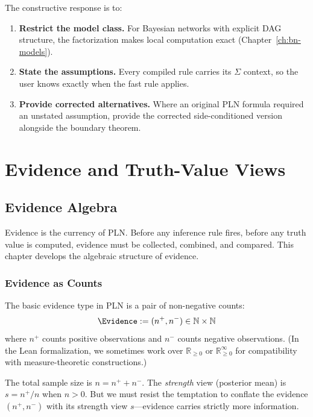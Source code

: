 \documentclass[11pt,openany]{report}
\begin{document}
The constructive response is to:
\begin{enumerate}
\item \textbf{Restrict the model class.}  For Bayesian networks with
  explicit DAG structure, the factorization makes local computation
  exact (Chapter~\ref{ch:bn-models}).
\item \textbf{State the assumptions.}  Every compiled rule carries its
  $\Sigma$ context, so the user knows exactly when the fast rule applies.
\item \textbf{Provide corrected alternatives.}  Where an original PLN
  formula required an unstated assumption, provide the corrected
  side-conditioned version alongside the boundary theorem.
\end{enumerate}


\part{Evidence and Truth-Value Views}
\label{part:evidence}

\chapter{Evidence Algebra}
\label{ch:evidence}

Evidence is the currency of PLN.  Before any inference rule fires, before
any truth value is computed, evidence must be collected, combined, and
compared.  This chapter develops the algebraic structure of evidence.

\section{Evidence as Counts}

The basic evidence type in PLN is a pair of non-negative counts:
\[
  \Evidence := (n^+, n^-) \in \mathbb{N} \times \mathbb{N}
\]
where $n^+$ counts positive observations and $n^-$ counts negative
observations.  (In the Lean formalization, we sometimes work over
$\mathbb{R}_{\ge 0}$ or $\mathbb{R}_{\ge 0}^\infty$ for compatibility
with measure-theoretic constructions.)

The total sample size is $n = n^+ + n^-$.  The \emph{strength} view
(posterior mean) is $s = n^+ / n$ when $n > 0$.  But we must resist
the temptation to conflate the evidence $(n^+, n^-)$ with its
strength view $s$---evidence carries strictly more information.
\end{document}
